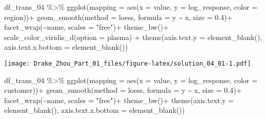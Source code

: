 \documentclass[
]{article}
\newenvironment{Shaded}{\begin{snugshade}}{\end{snugshade}}
\newcommand{\AttributeTok}[1]{\textcolor[rgb]{0.77,0.63,0.00}{#1}}
\newcommand{\FloatTok}[1]{\textcolor[rgb]{0.00,0.00,0.81}{#1}}
\newcommand{\FunctionTok}[1]{\textcolor[rgb]{0.00,0.00,0.00}{#1}}
\newcommand{\NormalTok}[1]{#1}
\newcommand{\SpecialCharTok}[1]{\textcolor[rgb]{0.00,0.00,0.00}{#1}}
\newcommand{\StringTok}[1]{\textcolor[rgb]{0.31,0.60,0.02}{#1}}
\begin{document}
\begin{Shaded}
\begin{Highlighting}[]
\NormalTok{df\_trans\_04 }\SpecialCharTok{\%\textgreater{}\%} 
  \FunctionTok{ggplot}\NormalTok{(}\AttributeTok{mapping =} \FunctionTok{aes}\NormalTok{(}\AttributeTok{x =}\NormalTok{ value, }\AttributeTok{y =}\NormalTok{ log\_response, }\AttributeTok{color =}\NormalTok{ region))}\SpecialCharTok{+}
  \FunctionTok{geom\_smooth}\NormalTok{(}\AttributeTok{method =} \StringTok{\textquotesingle{}loess\textquotesingle{}}\NormalTok{, }\AttributeTok{formula =}\NormalTok{ y }\SpecialCharTok{\textasciitilde{}}\NormalTok{ x, }\AttributeTok{size =} \FloatTok{0.4}\NormalTok{)}\SpecialCharTok{+}
  \FunctionTok{facet\_wrap}\NormalTok{(}\SpecialCharTok{\textasciitilde{}}\NormalTok{name, }\AttributeTok{scales =} \StringTok{"free"}\NormalTok{)}\SpecialCharTok{+}
  \FunctionTok{theme\_bw}\NormalTok{()}\SpecialCharTok{+}
  \FunctionTok{scale\_color\_viridis\_d}\NormalTok{(}\AttributeTok{option =} \StringTok{\textquotesingle{}plasma\textquotesingle{}}\NormalTok{) }\SpecialCharTok{+}
  \FunctionTok{theme}\NormalTok{(}\AttributeTok{axis.text.y =} \FunctionTok{element\_blank}\NormalTok{(), }\AttributeTok{axis.text.x.bottom =} \FunctionTok{element\_blank}\NormalTok{())}
\end{Highlighting}
\end{Shaded}

\texttt{[image: Drake\_Zhou\_Part\_01\_files/figure-latex/solution\_04\_01-1.pdf]}

\begin{Shaded}
\begin{Highlighting}[]
\NormalTok{df\_trans\_04 }\SpecialCharTok{\%\textgreater{}\%} 
  \FunctionTok{ggplot}\NormalTok{(}\AttributeTok{mapping =} \FunctionTok{aes}\NormalTok{(}\AttributeTok{x =}\NormalTok{ value, }\AttributeTok{y =}\NormalTok{ log\_response, }\AttributeTok{color =}\NormalTok{ customer))}\SpecialCharTok{+}
  \FunctionTok{geom\_smooth}\NormalTok{(}\AttributeTok{method =} \StringTok{\textquotesingle{}loess\textquotesingle{}}\NormalTok{, }\AttributeTok{formula =}\NormalTok{ y }\SpecialCharTok{\textasciitilde{}}\NormalTok{ x, }\AttributeTok{size =} \FloatTok{0.4}\NormalTok{)}\SpecialCharTok{+}
  \FunctionTok{facet\_wrap}\NormalTok{(}\SpecialCharTok{\textasciitilde{}}\NormalTok{name, }\AttributeTok{scales =} \StringTok{"free"}\NormalTok{)}\SpecialCharTok{+}
  \FunctionTok{theme\_bw}\NormalTok{()}\SpecialCharTok{+}
  \FunctionTok{theme}\NormalTok{(}\AttributeTok{axis.text.y =} \FunctionTok{element\_blank}\NormalTok{(), }\AttributeTok{axis.text.x.bottom =} \FunctionTok{element\_blank}\NormalTok{())}
\end{Highlighting}
\end{Shaded}
\end{document}
